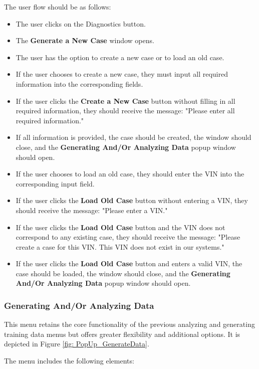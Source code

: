 \documentclass[]{scrreprt}
\begin{document}
The user flow should be as follows:

\begin{itemize}
    \item The user clicks on the Diagnostics button.
    \item The \textbf{Generate a New Case} window opens.
    \item The user has the option to create a new case or to load an old case.
    \item If the user chooses to create a new case, they must input all required information into the corresponding fields.
    \item If the user clicks the \textbf{Create a New Case} button without filling in all required information, they should receive the message: "Please enter all required information."
    \item If all information is provided, the case should be created, the window should close, and the \textbf{Generating And/Or Analyzing Data} popup window should open.
    \item If the user chooses to load an old case, they should enter the VIN into the corresponding input field.
    \item If the user clicks the \textbf{Load Old Case} button without entering a VIN, they should receive the message: "Please enter a VIN."
    \item If the user clicks the \textbf{Load Old Case} button and the VIN does not correspond to any existing case, they should receive the message: "Please create a case for this VIN. This VIN does not exist in our systems."
    \item If the user clicks the \textbf{Load Old Case} button and enters a valid VIN, the case should be loaded, the window should close, and the \textbf{Generating And/Or Analyzing Data} popup window should open.
\end{itemize}

\subsubsection{Generating And/Or Analyzing Data}

This menu retains the core functionality of the previous analyzing and generating training data 
menus but offers greater flexibility and additional options. It is depicted in Figure \ref{fig: PopUp_GenerateData}.

The menu includes the following elements:
\end{document}
